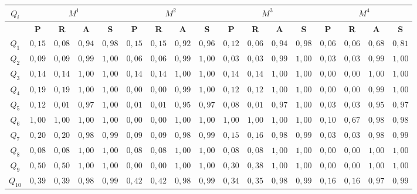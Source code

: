\begin{sidewaystable}[!htb]
\renewcommand{\arraystretch}{1.3}
\begin{center}
\begin{tabular}{|c||c|c|c|c||c|c|c|c||c|c|c|c||c|c|c|c|}
\hline
 \textbf{$Q_i$}&\multicolumn{4}{|c||}{$M^{1}$} & \multicolumn{4}{|c||}{$M^{2}$}& \multicolumn{4}{|c||}{$M^{3}$} & \multicolumn{4}{|c|}{$M^{4}$} \\ \hline
	  &\textbf{P} & \textbf{R} & \textbf{A} & \textbf{S} &		\textbf{P} & \textbf{R} & \textbf{A} & \textbf{S} &			\textbf{P} & \textbf{R} & \textbf{A} & \textbf{S} &		\textbf{P} & \textbf{R} & \textbf{A} & \textbf{S}  \\ \hline \hline
$Q_1$  	  &$0,15$ & $0,08$ & $0,94$ & $0,98$ &		$0,15$ & $0,15$ & $0,92$ & $0,96$ &	$0,12$ & $0,06$ & $0,94$ & $0,98$ &	$0,06$ & $0,06$ & $0,68$ & $0,81$ \\ \hline
$Q_2$  	  &$0,09$ & $0,09$ & $0,99$ & $1,00$ & 		$0,06$ & $0,06$ & $0,99$ & $1,00$ & 	$0,03$ & $0,03$ & $0,99$ & $1,00$ & 	$0,03$ & $0,03$ & $0,99$ & $1,00$ \\ \hline
$Q_3$  	  &$0,14$ & $0,14$ & $1,00$ & $1,00$ & 		$0,14$ & $0,14$ & $1,00$ & $1,00$ & 	$0,14$ & $0,14$ & $1,00$ & $1,00$ & 	$0,00$ & $0,00$ & $1,00$ & $1,00$ \\ \hline
$Q_4$  	  &$0,19$ & $0,19$ & $1,00$ & $1,00$ &		$0,00$ & $0,00$ & $0,99$ & $1,00$ & 	$0,12$ & $0,12$ & $1,00$ & $1,00$ & 	$0,00$ & $0,00$ & $0,99$ & $1,00$ \\ \hline
$Q_5$  	  &$0,12$ & $0,01$ & $0,97$ & $1,00$ & 		$0,01$ & $0,01$ & $0,95$ & $0,97$ & 	$0,08$ & $0,01$ & $0,97$ & $1,00$ & 	$0,03$ & $0,03$ & $0,95$ & $0,97$ \\ \hline
$Q_6$  	  &$1,00$ & $1,00$ & $1,00$ & $1,00$ & 		$0,00$ & $0,00$ & $1,00$ & $1,00$ & 	$1,00$ & $1,00$ & $1,00$ & $1,00$ & 	$0,10$ & $0,67$ & $0,98$ & $0,98$ \\ \hline
$Q_7$  	  &$0,20$ & $0,20$ & $0,98$ & $0,99$ & 		$0,09$ & $0,09$ & $0,98$ & $0,99$ & 	$0,15$ & $0,16$ & $0,98$ & $0,99$ & 	$0,03$ & $0,03$ & $0,98$ & $0,99$ \\ \hline
$Q_8$  	  &$0,08$ & $0,08$ & $1,00$ & $1,00$ & 		$0,08$ & $0,08$ & $1,00$ & $1,00$ & 	$0,08$ & $0,08$ & $1,00$ & $1,00$ & 	$0,00$ & $0,00$ & $1,00$ & $1,00$ \\ \hline
$Q_9$  	  &$0,50$ & $0,50$ & $1,00$ & $1,00$ & 		$0,00$ & $0,00$ & $1,00$ & $1,00$ & 	$0,30$ & $0,38$ & $1,00$ & $1,00$ & 	$0,00$ & $0,00$ & $1,00$ & $1,00$ \\ \hline
$Q_{10}$  &$0,39$ & $0,39$ & $0,98$ & $0,99$ & 		$0,42$ & $0,42$ & $0,98$ & $0,99$ & 	$0,34$ & $0,35$ & $0,98$ & $0,99$ & 	$0,16$ & $0,16$ & $0,97$ & $0,99$ \\ \hline

\end{tabular}
\end{center}
\end{sidewaystable}
